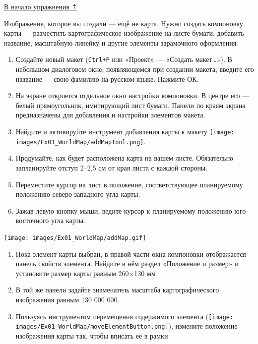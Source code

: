 \documentclass[
  12pt,
]{book}
\begin{document}
\protect\hyperlink{map-design-world}{В начало упражнения ⇡}

Изображение, которое вы создали --- ещё не карта. Нужно создать компоновку карты --- разместить картографическое изображение на листе бумаги, добавить название, масштабную линейку и другие элементы зарамочного оформления.

\begin{enumerate}
\def\labelenumi{\arabic{enumi}.}
\item
  Создайте новый макет (\texttt{Ctrl+P} или «Проект» --- «Создать макет\ldots»). В небольшом диалоговом окне, появляющемся при создании макета, введите его название --- свою фамилию на русском языке. Нажмите ОК.
\item
  На экране откроется отдельное окно настройки компоновки. В центре его --- белый прямоугольник, имитирующий лист бумаги. Панели по краям экрана предназначены для добавления и настройки элементов макета.
\item
  Найдите и активируйте инструмент добавления карты к макету \texttt{[image: images/Ex01\_WorldMap/addMapTool.png]}.
\item
  Продумайте, как будет расположена карта на вашем листе. Обязательно запланируйте отступ 2--2,5 см от края листа с каждой стороны.
\item
  Переместите курсор на лист в положение, соответствующее планируемому положению северо-западного угла карты.
\item
  Зажав левую кнопку мыши, ведите курсор к планируемому положению юго-восточного угла карты.
\end{enumerate}

\texttt{[image: images/Ex01\_WorldMap/addMap.gif]}

\begin{enumerate}
\def\labelenumi{\arabic{enumi}.}
\setcounter{enumi}{6}
\item
  Пока элемент карты выбран, в правой части окна компоновки отображается панель свойств элемента. Найдите в нём раздел «Положение и размер» и установите размер карты равным 260×130 мм
\item
  В той же панели задайте знаменатель масштаба картографического изображения равным 130 000 000.
\item
  Пользуясь инструментом перемещения содержимого элемента (\texttt{[image: images/Ex01\_WorldMap/moveElementButton.png]}), измените положение изображения карты так, чтобы вписать её в рамки
\end{enumerate}
\end{document}
